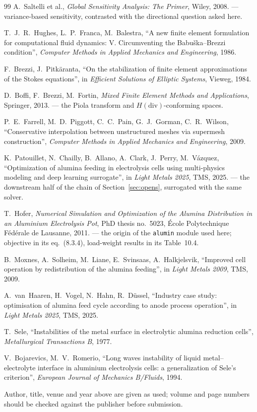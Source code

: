 \documentclass[11pt,a4paper]{article}
\theoremstyle{plain}
\theoremstyle{definition}
\theoremstyle{remark}
\begin{document}
\begin{thebibliography}{99}
 A.~Saltelli et al., \emph{Global Sensitivity Analysis: The
Primer}, Wiley, 2008. --- variance-based sensitivity, contrasted with the
directional question asked here.

 T.~J.~R.~Hughes, L.~P.~Franca, M.~Balestra, ``A new finite
element formulation for computational fluid dynamics: V. Circumventing the
Babu\v{s}ka--Brezzi condition'', \emph{Computer Methods in Applied Mechanics and
Engineering}, 1986.

 F.~Brezzi, J.~Pitk\"aranta, ``On the stabilization
of finite element approximations of the Stokes equations'', in
\emph{Efficient Solutions of Elliptic Systems}, Vieweg, 1984.

 D.~Boffi, F.~Brezzi, M.~Fortin, \emph{Mixed Finite Element Methods
and Applications}, Springer, 2013. --- the Piola transform and
$H(\mathrm{div})$-conforming spaces.

 P.~E.~Farrell, M.~D.~Piggott, C.~C.~Pain, G.~J.~Gorman,
C.~R.~Wilson, ``Conservative interpolation between unstructured meshes via
supermesh construction'', \emph{Computer Methods in Applied Mechanics and
Engineering}, 2009.

 K.~Patouillet, N.~Chailly, B.~Allano, A.~Clark, J.~Perry,
M.~V\'azquez, ``Optimization of alumina feeding in electrolysis cells using
multi-physics modeling and deep learning surrogate'', in \emph{Light Metals
2025}, TMS, 2025. --- the downstream half of the chain of
Section~\ref{sec:opens}, surrogated with the same solver.

 T.~Hofer, \emph{Numerical Simulation and Optimization of the
Alumina Distribution in an Aluminium Electrolysis Pot}, PhD thesis no.~5023,
\'Ecole Polytechnique F\'ed\'erale de Lausanne, 2011. --- the origin of the
\texttt{alumin} module used here; objective in its eq.~(8.3.4), load-weight
results in its Table~10.4.

 B.~Moxnes, A.~Solheim, M.~Liane, E.~Svinsaas, A.~Halkjelsvik,
``Improved cell operation by redistribution of the alumina feeding'', in
\emph{Light Metals 2009}, TMS, 2009.

 A.~van~Haaren, H.~Vogel, N.~Hahn, R.~D\"ussel, ``Industry
case study: optimisation of alumina feed cycle according to anode process
operation'', in \emph{Light Metals 2025}, TMS, 2025.

 T.~Sele, ``Instabilities of the metal surface in electrolytic
alumina reduction cells'', \emph{Metallurgical Transactions B}, 1977.

 V.~Bojarevics, M.~V.~Romerio, ``Long waves instability of
liquid metal--electrolyte interface in aluminium electrolysis cells: a
generalization of Sele's criterion'', \emph{European Journal of Mechanics
B/Fluids}, 1994.

\end{thebibliography}

\noindent\footnotesize
Author, title, venue and year above are given as used; volume and page numbers
should be checked against the publisher before submission.
\end{document}
